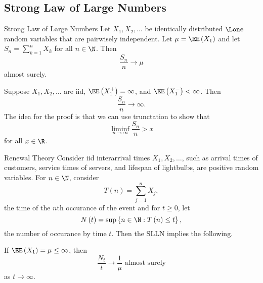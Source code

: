 \documentclass[stat901]{subfiles}
\begin{document}
    \subsection{Strong Law of Large Numbers}
    
    \begin{theorem}{Strong Law of Large Numbers}
        Let $X_1,X_2,\ldots$ be identically distributed $\Lone$ random variables that are pairwisely independent. Let $\mu=\EE\left( X_1 \right)$ and let $S_n = \sum^{n}_{k=1}X_k$ for all $n\in\N$. Then
        \begin{equation*}
            \frac{S_n}{n}\to\mu
        \end{equation*}
        almost surely.
    \end{theorem}

    \rruleline

    \np Suppose $X_1,X_2,\ldots$ are iid, $\EE\left( X_1^+ \right) = \infty$, and $\EE\left( X_1^- \right) < \infty$. Then
    \begin{equation*}
        \frac{S_n}{n}\to\infty.
    \end{equation*}
    The idea for the proof is that we can use trunctation to show that
    \begin{equation*}
        \liminf_{n\to\infty} \frac{S_n}{n} > x
    \end{equation*}
    for all $x\in\R$.
    
    \begin{example}{Renewal Theory}
        Consider iid interarrival times $X_1,X_2,\ldots$, such as arrival times of customers, service times of servers, and lifespan of lightbulbs, are positive random variables. For $n\in\N$, consider
        \begin{equation*}
            T\left( n \right) = \sum^{n}_{j=1} X_j,
        \end{equation*}
        the time of the $n$th occurance of the event and for $t\geq 0$, let
        \begin{equation*}
            N\left( t \right) = \sup\left\lbrace n\in\N:T\left( n \right)\leq t \right\rbrace,
        \end{equation*}
        the number of occurance by time $t$. Then the SLLN implies the following. 

        If $\EE\left( X_1 \right)=\mu\leq\infty$, then
        \begin{equation*}
            \frac{N_t}{t}\to \frac{1}{\mu} \text{ almost surely}
        \end{equation*}
        as $t\to\infty$.
    \end{example}
\end{document}
